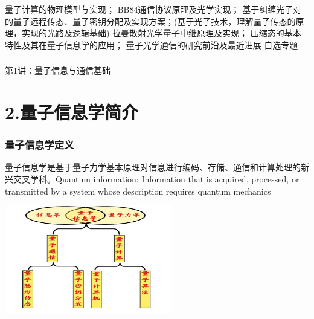 \begin{frame}
    \begin{tcolorbox4}[分组讨论及报告专题设置(2)]    
        \begin{enumerate}
            \Item   量子计算的物理模型与实现；
            \Item   BB84通信协议原理及光学实现；
            \Item   基于纠缠光子对的量子远程传态、量子密钥分配及实现方案；(基于光子技术，理解量子传态的原理，实现的光路及逻辑基础)
            \Item   拉曼散射光学量子中继原理及实现；
            \Item   压缩态的基本特性及其在量子信息学的应用；
            \Item  量子光学通信的研究前沿及最近进展
            \Item  自选专题
        \end{enumerate}
    \end{tcolorbox4} 
\end{frame}

\begin{frame} [plain]
    \frametitle{}
    \Background[1] 
    \begin{center}
    {\huge 第1讲：量子信息与通信基础}
    \end{center}  
    \addtocounter{framenumber}{-1}   
\end{frame}

\section{2.量子信息学简介}

\begin{frame} 
    \frametitle{量子信息学定义}
    量子信息学是基于量子力学基本原理对信息进行编码、存储、通信和计算处理的新兴交叉学科。Quantum information: Information that is acquired, processed, or transmitted by a system whose description requires quantum mechanics\\
    \begin{center}
        \includegraphics[width=0.55\textwidth]{figs/1.png}
    \end{center}   
\end{frame}

